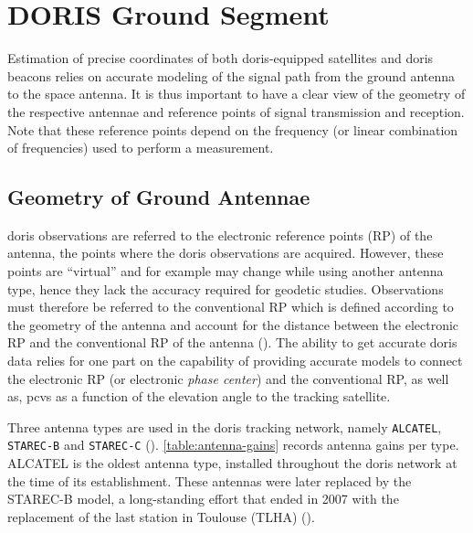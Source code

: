 \section{DORIS Ground Segment}\label{sec:doris-ground-segment}

Estimation of precise coordinates of both \gls{doris}-equipped satellites and 
\gls{doris} beacons relies on accurate modeling of the signal path from the
ground antenna to the space antenna. It is thus important to have a clear view of 
the geometry of the respective antennae and reference points of signal transmission 
and reception. Note that these reference points depend on the frequency (or linear 
combination of frequencies) used to perform a measurement.

\subsection{Geometry of Ground Antennae}\label{ssec:antenae-geometry}
\gls{doris} observations are referred to the electronic reference points (RP) of the 
antenna, the points where the \gls{doris} observations are acquired. However, 
these points are ``virtual'' and for example may change while using another antenna 
type, hence they lack the accuracy required for geodetic studies.
Observations must therefore be referred to the conventional RP which is defined 
according to the geometry of the antenna and account for the distance between 
the electronic RP and the conventional RP of the antenna (\cite{Tourain2016}). 
The ability to get accurate \gls{doris} data relies 
for one part on the capability of providing accurate models to connect the 
electronic RP (or electronic \emph{phase center}) and the conventional RP, as well 
as, \glspl{pcv} as a function of the elevation angle to the tracking satellite.

Three antenna types are used in the \gls{doris} tracking network, namely 
\texttt{ALCATEL}, \texttt{STAREC-B} and \texttt{STAREC-C} (\cite{Saunier2016}). 
\autoref{table:antenna-gains} records antenna gains per type. 
ALCATEL is the oldest antenna type, installed throughout the \gls{doris} network 
at the time of its establishment. These antennas were later replaced by the STAREC-B 
model, a long-standing effort that ended in 2007 with the replacement of the last 
station in Toulouse (TLHA) (\cite{Stepanek2022b}).

